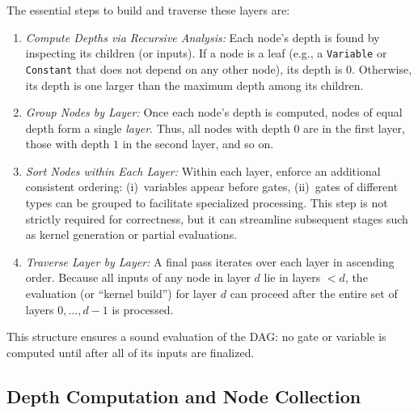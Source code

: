 The essential steps to build and traverse these layers are:

\begin{enumerate}
    \item \emph{Compute Depths via Recursive Analysis:}  
      Each node’s depth is found by inspecting its children (or inputs).  If a node is a leaf (e.g., a \texttt{Variable} or \texttt{Constant} that does not depend on any other node), its depth is 0.  Otherwise, its depth is one larger than the maximum depth among its children.  

    \item \emph{Group Nodes by Layer:}  
      Once each node’s depth is computed, nodes of equal depth form a single \emph{layer}. Thus, all nodes with depth \(0\) are in the first layer, those with depth \(1\) in the second layer, and so on.  

    \item \emph{Sort Nodes within Each Layer:}  
      Within each layer, enforce an additional consistent ordering: (i)~variables appear before gates, (ii)~gates of different types can be grouped to facilitate specialized processing.  This step is not strictly required for correctness, but it can streamline subsequent stages such as kernel generation or partial evaluations.

    \item \emph{Traverse Layer by Layer:}  
      A final pass iterates over each layer in ascending order.  Because all inputs of any node in layer \(d\) lie in layers \(< d\), the evaluation (or “kernel build”) for layer \(d\) can proceed after the entire set of layers \(0,\dots,d-1\) is processed.
\end{enumerate}

This structure ensures a sound evaluation of the DAG: no gate or variable is computed until after all of its inputs are finalized.

\subsection{Depth Computation and Node Collection}

